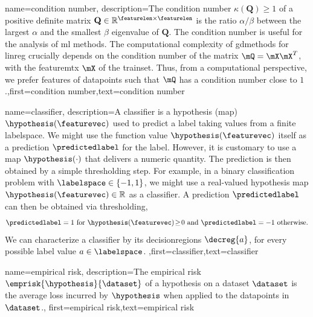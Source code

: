 {{
{
	name={condition number},
	description={The condition number $\kappa(\mathbf{Q}) \geq 1$ of a 
		positive definite 
		matrix $\mathbf{Q} \in \mathbb{R}^{\featurelen \times \featurelen}$ is the ratio 
		$\alpha /\beta  $ between the 
		largest $\alpha$ and the smallest $\beta$ \gls{eigenvalue} of 
		$\mathbf{Q}$. The condition number is useful for the analysis of \gls{ml} methods. 
		The computational complexity of \gls{gdmethods} for \gls{linreg} crucially depends on the 
		condition number of the matrix $\mQ = \mX \mX^{T}$, with the \gls{featuremtx} $\mX$ 
		of the \gls{trainset}. Thus, from a computational perspective, we prefer \gls{feature}s of 
		\gls{datapoint}s such that $\mQ$ has a condition number close to $1$.},first={condition number},text={condition number} 
}

{
	name={classifier},
	description={A classifier is a \gls{hypothesis} (map) $\hypothesis(\featurevec)$ 
		used to predict a \gls{label} taking values from a finite \gls{labelspace}. We might use the 
		function value $\hypothesis(\featurevec)$ itself as a \gls{prediction} $\predictedlabel$ for 
		the \gls{label}. However, it is customary to use a map $\hypothesis(\cdot)$ that delivers 
		a numeric quantity. The \gls{prediction} is then obtained by a simple thresholding step. 
		For example, in a binary \gls{classification} problem with \label{labelspace} $\labelspace \in  \{ -1,1\}$, 
		we might use a real-valued \gls{hypothesis} map $\hypothesis(\featurevec) \in \mathbb{R}$ 
		as a classifier. A \gls{prediction} $\predictedlabel$ can then be obtained via thresholding,  
		 \begin{equation} 
		 	\label{equ_def_threshold_bin_classifier_dict}
		 	\predictedlabel =1   \mbox{ for } \hypothesis(\featurevec)\!\geq\!0 \mbox{ and } 	\predictedlabel =-1  \mbox{ otherwise.}
	 		\end{equation}
 		We can characterize a classifier by its \gls{decisionregion}s $\decreg{a}$, for 
 		every possible \gls{label} value $a \in \labelspace$. },first={classifier},text={classifier} 
}

{name={empirical risk},
  description={The empirical \gls{risk} $\emprisk{\hypothesis}{\dataset}$ 
  	of a \gls{hypothesis} on a \gls{dataset} $\dataset$ is the average \gls{loss} incurred 
  	by $\hypothesis$ when applied to the \gls{datapoint}s in $\dataset$.},
  first={empirical risk},text={empirical risk} 
}

}}
